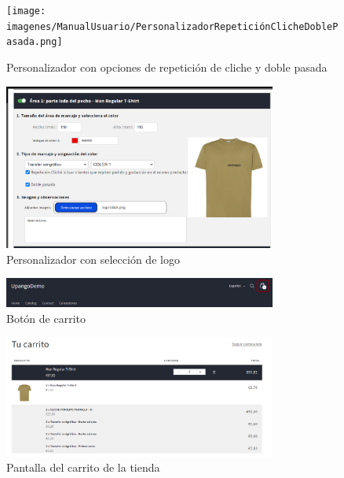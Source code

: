 \documentclass[12pt]{article}
\begin{document}
\begin{figure}[ht]
    \centering
    \texttt{[image: imagenes/ManualUsuario/PersonalizadorRepeticiónClicheDoblePasada.png]}
    \caption{\label{fig:PersonalizadorCheckboxes}Personalizador con opciones de repetición de cliche y doble pasada}
    \vspace{\fill}
\end{figure}

\begin{figure}[ht]
    \centering
    \includegraphics[width=0.8\textwidth]{imagenes/ManualUsuario/PersonalizadorLogoSeleccionado.png}
    \caption{\label{fig:PersonalizadorLogo}Personalizador con selección de logo}
    \vspace{\fill}
\end{figure}

\begin{figure}[ht]
    \centering
    \includegraphics[width=0.8\textwidth]{imagenes/ManualUsuario/BotonCarrito.png}
    \caption{\label{fig:BotonCarrito}Botón de carrito}
    \vspace{\fill}
\end{figure}

\begin{figure}[ht]
    \centering
    \includegraphics[width=0.8\textwidth]{imagenes/ManualUsuario/PantallaCarrito.png}
    \caption{\label{fig:Carrito}Pantalla del carrito de la tienda}
    \vspace{\fill}
\end{figure}
\end{document}
